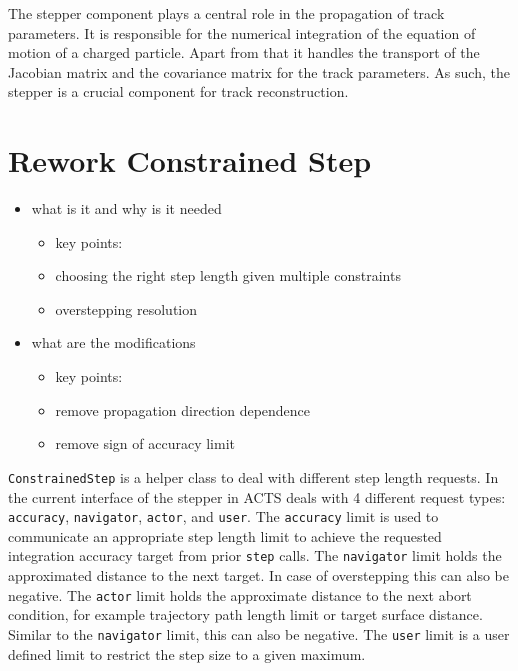 The stepper component plays a central role in the propagation of track parameters. It is responsible for the numerical integration of the equation of motion of a charged particle. Apart from that it handles the transport of the Jacobian matrix and the covariance matrix for the track parameters. As such, the stepper is a crucial component for track reconstruction.

\section{Rework Constrained Step}

\begin{itemize}
    \color{red}
    \item what is it and why is it needed
    \begin{itemize}
        \item key points:
        \item choosing the right step length given multiple constraints
        \item overstepping resolution
    \end{itemize}
    \item what are the modifications
    \begin{itemize}
        \item key points:
        \item remove propagation direction dependence
        \item remove sign of accuracy limit
    \end{itemize}
\end{itemize}

\texttt{ConstrainedStep} is a helper class to deal with different step length requests. In the current interface of the stepper in ACTS deals with 4 different request types: \texttt{accuracy}, \texttt{navigator}, \texttt{actor}, and \texttt{user}. The \texttt{accuracy} limit is used to communicate an appropriate step length limit to achieve the requested integration accuracy target from prior \texttt{step} calls. The \texttt{navigator} limit holds the approximated distance to the next target. In case of overstepping this can also be negative. The \texttt{actor} limit holds the approximate distance to the next abort condition, for example trajectory path length limit or target surface distance. Similar to the \texttt{navigator} limit, this can also be negative. The \texttt{user} limit is a user defined limit to restrict the step size to a given maximum.

